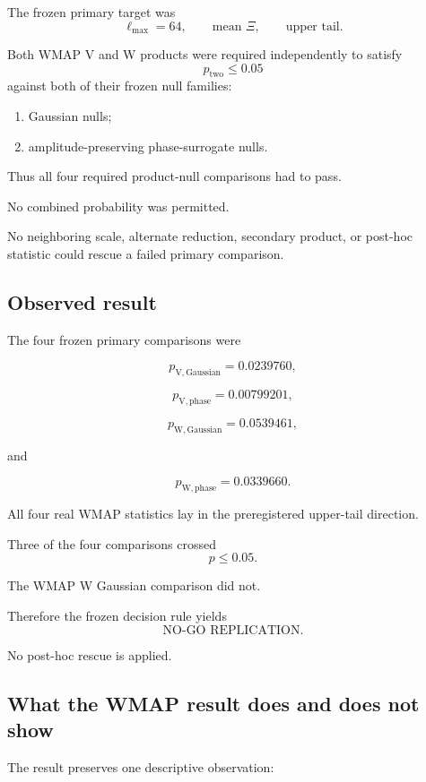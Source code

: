 The frozen primary target was
\[
\ell_{\max}=64,
\qquad
\text{mean }\Xi,
\qquad
\text{upper tail}.
\]

Both WMAP V and W products were required independently to satisfy
\[
p_{\mathrm{two}}\le0.05
\]
against both of their frozen null families:

\begin{enumerate}[label=(\roman*)]

\item Gaussian nulls;

\item amplitude-preserving phase-surrogate nulls.

\end{enumerate}

Thus all four required product-null comparisons had to pass.

No combined probability was permitted.

No neighboring scale, alternate reduction, secondary product, or
post-hoc statistic could rescue a failed primary comparison.

\subsection{Observed result}

The four frozen primary comparisons were

\[
p_{\mathrm{V,Gaussian}}
=
0.0239760,
\]

\[
p_{\mathrm{V,phase}}
=
0.00799201,
\]

\[
p_{\mathrm{W,Gaussian}}
=
0.0539461,
\]

and

\[
p_{\mathrm{W,phase}}
=
0.0339660.
\]

All four real WMAP statistics lay in the preregistered upper-tail
direction.

Three of the four comparisons crossed
\[
p\le0.05.
\]

The WMAP W Gaussian comparison did not.

Therefore the frozen decision rule yields
\[
\boxed{\text{NO-GO REPLICATION}}.
\]

No post-hoc rescue is applied.

\subsection{What the WMAP result does and does not show}


The result preserves one descriptive observation:


